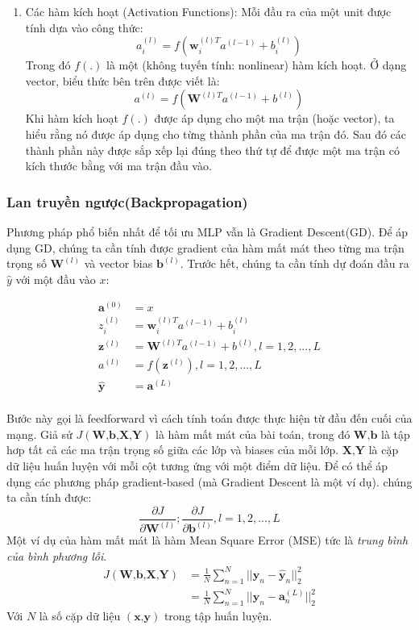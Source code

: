 \begin{enumerate}
	\item Các hàm kích hoạt (Activation Functions): Mỗi đầu ra của một unit được tính dựa vào công thức:
	\begin{equation}
	a_{i}^{(l)} = f(\textbf{w}_{i}^{(l)T}a^{(l-1)}+b_{i}^{(l)})
	\end{equation}
	Trong đó $f(.)$ là một (không tuyến tính: nonlinear) hàm kích hoạt. Ở dạng vector, biểu thức bên trên được viết là:
	\begin{equation}
	a^{(l)} = f(\textbf{W}^{(l)T}a^{(l-1)}+b^{(l)})
	\end{equation}
	Khi hàm kích hoạt $f(.)$ được áp dụng cho một ma trận (hoặc vector), ta hiểu rằng nó được áp dụng cho từng thành phần của ma trận đó. Sau đó các thành phần này được sắp xếp lại đúng theo thứ tự để được một ma trận có kích thước bằng với ma trận đầu vào.
\end{enumerate}
\subsubsection{Lan truyền ngược(Backpropagation)}
Phương pháp phổ biến nhất để tối ưu MLP vẫn là Gradient Descent(GD). Để áp dụng GD, chúng ta cần tính được gradient của hàm mất mát theo từng ma trận trọng số $\textbf{W}^{(l)}$ và vector bias $\textbf{b}^{(l)}$. Trước hết, chúng ta cần tính dự đoán đầu ra $\hat{y}$ với một đầu vào $x$:

\begin{align*}
\textbf{a}^{(0)} &= x \\
\textit{z}_{i}^{(l)} &= \textbf{w}_{i}^{(l)T}a^{(l-1)}+b_{i}^{(l)} \\
\textbf{z}^{(l)} &= \textbf{W}^{(l)T}a^{(l-1)}+b^{(l)}, l = 1,2,...,L \\
a^{(l)} &= f(\textbf{z}^{(l)}), l = 1,2,...,L\\
\hat{\textbf{y}} &= \textbf{a}^{(L)} \\
\end{align*}

Bước này gọi là feedforward vì cách tính toán được thực hiện từ đầu đến cuối của mạng.
Giả sử $\textit{J}(\textbf{W,b,X,Y})$ là hàm mất mát của bài toán, trong đó $\textbf{W,b}$ là tập hơp tất cả các ma trận trọng số giữa các lớp và biases của mỗi lớp. $\textbf{X,Y}$ là cặp dữ liệu huấn luyện với mỗi cột tương ứng với một điểm dữ liệu. Để có thể áp dụng các phương pháp gradient-based (mà Gradient Descent là một ví dụ). chúng ta cần tính được:
\begin{equation*}
\frac{\partial J}{\partial \textbf{W}^{(l)}}; \frac{\partial J}{\partial \textbf{b}^{(l)}}, l = 1,2,...,L
\end{equation*}
Một ví dụ của hàm mất mát là hàm Mean Square Error (MSE) tức là \textit{trung bình của bình phương lỗi}.
\begin{align*}
\textit{J}(\textbf{W,b,X,Y}) &= \frac{1}{N}\sum_{n=1}^{N} \vert\vert \textbf{y}_{n} - \hat{\textbf{y}}_{n} \vert\vert_{2}^2 \\
&= \frac{1}{N}\sum_{n=1}^{N} \vert\vert \textbf{y}_{n} - \textbf{a}_{n}^{(L)} \vert\vert_{2}^2
\end{align*}
Với $N$ là số cặp dữ liệu $(\textbf{x,y})$ trong tập huấn luyện.

